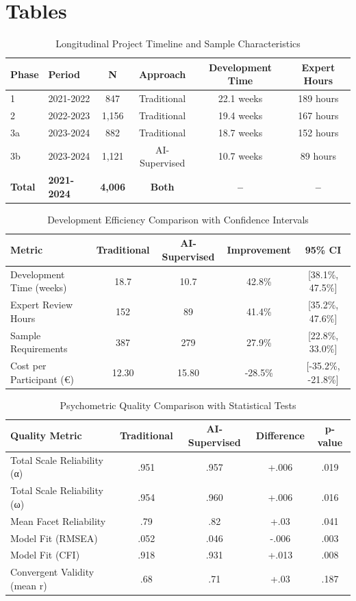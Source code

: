 \documentclass[12pt,a4paper]{article}
\begin{document}
\newpage

\section{Tables}

\begin{table}[ht]
\centering
\caption{Longitudinal Project Timeline and Sample Characteristics}
\label{tab:project-timeline}
\begin{tabular}{llcccc}
\toprule
Phase & Period & N & Approach & Development Time & Expert Hours \\
\midrule
1 & 2021-2022 & 847 & Traditional & 22.1 weeks & 189 hours \\
2 & 2022-2023 & 1,156 & Traditional & 19.4 weeks & 167 hours \\
3a & 2023-2024 & 882 & Traditional & 18.7 weeks & 152 hours \\
3b & 2023-2024 & 1,121 & AI-Supervised & 10.7 weeks & 89 hours \\
\midrule
\textbf{Total} & \textbf{2021-2024} & \textbf{4,006} & \textbf{Both} & \textbf{--} & \textbf{--} \\
\bottomrule
\end{tabular}
\end{table}

\begin{table}[ht]
\centering
\caption{Development Efficiency Comparison with Confidence Intervals}
\label{tab:efficiency-comparison}
\begin{tabular}{lcccc}
\toprule
Metric & Traditional & AI-Supervised & Improvement & 95\% CI \\
\midrule
Development Time (weeks) & 18.7 & 10.7 & 42.8\% & [38.1\%, 47.5\%] \\
Expert Review Hours & 152 & 89 & 41.4\% & [35.2\%, 47.6\%] \\
Sample Requirements & 387 & 279 & 27.9\% & [22.8\%, 33.0\%] \\
Cost per Participant (€) & 12.30 & 15.80 & -28.5\% & [-35.2\%, -21.8\%] \\
\bottomrule
\end{tabular}
\end{table}

\begin{table}[ht]
\centering
\caption{Psychometric Quality Comparison with Statistical Tests}
\label{tab:quality-comparison}
\begin{tabular}{lcccc}
\toprule
Quality Metric & Traditional & AI-Supervised & Difference & p-value \\
\midrule
Total Scale Reliability (α) & .951 & .957 & +.006 & .019 \\
Total Scale Reliability (ω) & .954 & .960 & +.006 & .016 \\
Mean Facet Reliability & .79 & .82 & +.03 & .041 \\
Model Fit (RMSEA) & .052 & .046 & -.006 & .003 \\
Model Fit (CFI) & .918 & .931 & +.013 & .008 \\
Convergent Validity (mean r) & .68 & .71 & +.03 & .187 \\
\bottomrule
\end{tabular}
\end{table}
\end{document}
